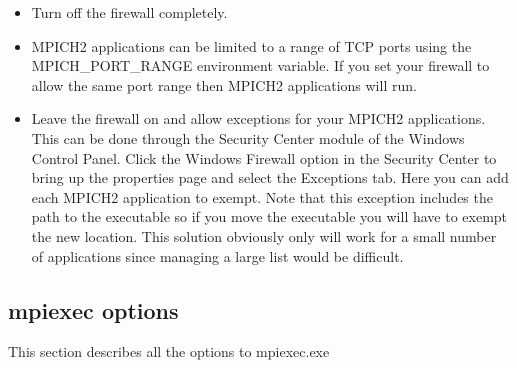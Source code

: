 \documentclass[dvipdfm,11pt]{article}
\begin{document}
\begin{itemize}
\item Turn off the firewall completely.
\item  MPICH2 applications can be limited to a range of TCP ports using the 
MPICH\_PORT\_RANGE environment variable.  If you set your firewall to allow the
same port range then MPICH2 applications will run.
\item Leave the firewall on and allow exceptions for your MPICH2 applications.
This can be done through the Security Center module of the Windows Control 
Panel.  Click the Windows Firewall option in the Security Center to bring up
the properties page and select the Exceptions tab.  Here you can add each 
MPICH2 application to exempt.  Note that this exception includes the path to
the executable so if you move the executable you will have to exempt the new
location.  This solution obviously only will work for a small number of 
applications since managing a large list would be difficult.
\end{itemize}

\subsection{mpiexec options}
This section describes all the options to mpiexec.exe
\end{document}
